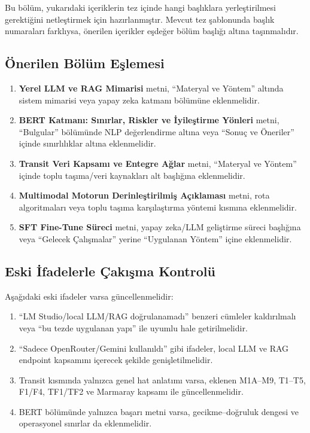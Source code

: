 Bu bölüm, yukarıdaki içeriklerin tez içinde hangi başlıklara yerleştirilmesi gerektiğini netleştirmek için hazırlanmıştır. Mevcut tez şablonunda başlık numaraları farklıysa, önerilen içerikler eşdeğer bölüm başlığı altına taşınmalıdır.

\subsection{Önerilen Bölüm Eşlemesi}

\begin{enumerate}
    \item \textbf{Yerel LLM ve RAG Mimarisi} metni, ``Materyal ve Yöntem'' altında sistem mimarisi veya yapay zeka katmanı bölümüne eklenmelidir.
    \item \textbf{BERT Katmanı: Sınırlar, Riskler ve İyileştirme Yönleri} metni, ``Bulgular'' bölümünde NLP değerlendirme altına veya ``Sonuç ve Öneriler'' içinde sınırlılıklar altına eklenmelidir.
    \item \textbf{Transit Veri Kapsamı ve Entegre Ağlar} metni, ``Materyal ve Yöntem'' içinde toplu taşıma/veri kaynakları alt başlığına eklenmelidir.
    \item \textbf{Multimodal Motorun Derinleştirilmiş Açıklaması} metni, rota algoritmaları veya toplu taşıma karşılaştırma yöntemi kısmına eklenmelidir.
    \item \textbf{SFT Fine-Tune Süreci} metni, yapay zeka/LLM geliştirme süreci başlığına veya ``Gelecek Çalışmalar'' yerine ``Uygulanan Yöntem'' içine eklenmelidir.
\end{enumerate}

\subsection{Eski İfadelerle Çakışma Kontrolü}

Aşağıdaki eski ifadeler varsa güncellenmelidir:
\begin{enumerate}
    \item ``LM Studio/local LLM/RAG doğrulanamadı'' benzeri cümleler kaldırılmalı veya ``bu tezde uygulanan yapı'' ile uyumlu hale getirilmelidir.
    \item ``Sadece OpenRouter/Gemini kullanıldı'' gibi ifadeler, local LLM ve RAG endpoint kapsamını içerecek şekilde genişletilmelidir.
    \item Transit kısmında yalnızca genel hat anlatımı varsa, eklenen M1A--M9, T1--T5, F1/F4, TF1/TF2 ve Marmaray kapsamı ile güncellenmelidir.
    \item BERT bölümünde yalnızca başarı metni varsa, gecikme--doğruluk dengesi ve operasyonel sınırlar da eklenmelidir.
\end{enumerate}

